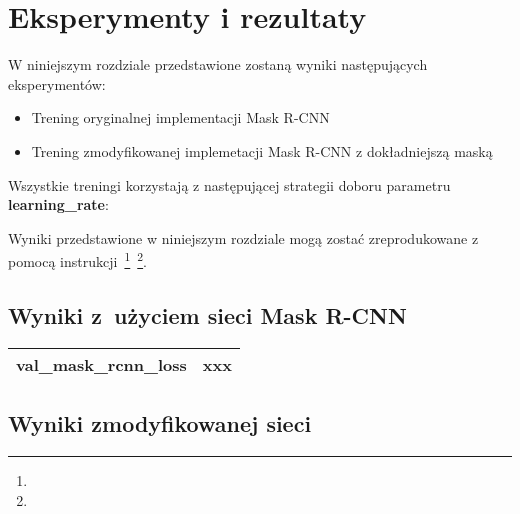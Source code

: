 \chapter{Eksperymenty i rezultaty}

W niniejszym rozdziale przedstawione zostaną wyniki następujących eksperymentów:

\begin{itemize}
 \item Trening oryginalnej implementacji Mask R-CNN
 \item Trening zmodyfikowanej implemetacji Mask R-CNN z dokładniejszą maską
\end{itemize}

Wszystkie treningi korzystają z następującej strategii doboru parametru \textbf{learning\_rate}:


Wyniki przedstawione w niniejszym rozdziale mogą zostać zreprodukowane z pomocą instrukcji~\footnote{}~\footnote{}.

\section{Wyniki z~użyciem sieci Mask R-CNN}

\begin{tabular}{|r|l|} \hline
  val\_mask\_rcnn\_loss & xxx \\
  \hline
\end{tabular}

\vspace{1cm}



\section{Wyniki zmodyfikowanej sieci}
\label{sec:wyniki_zmodyfikowanej}



